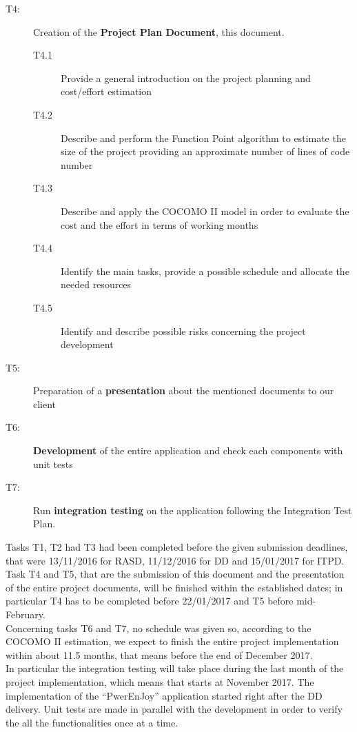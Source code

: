 \begin{description}
	\item[T4:] Creation of the \textbf{Project Plan Document}, this document.
	\begin{description}
		\item[T4.1] Provide a general introduction on the project planning and cost/effort estimation
		\item[T4.2] Describe and perform the Function Point algorithm to estimate the size of the project providing an approximate number of lines of code number
		\item[T4.3] Describe and apply the COCOMO II model in order to evaluate the cost and the effort in terms of working months
		\item[T4.4] Identify the main tasks, provide a possible schedule and allocate the needed resources
		\item[T4.5] Identify and describe possible risks concerning the project development
	\end{description}
	
	\item[T5:] Preparation of a \textbf{presentation} about the mentioned documents to our client
	
	\item[T6:] \textbf{Development} of the entire application and check each components with unit tests
	
	\item[T7:] Run \textbf{integration testing} on the application following the Integration Test Plan.
	
\end{description}
Tasks T1, T2 had T3 had been completed before the given submission deadlines, that were 13/11/2016 for RASD, 11/12/2016 for DD and 15/01/2017 for ITPD. \\
Task T4 and T5, that are the submission of this document and the presentation of the entire project documents, will be finished within the established dates; in particular T4 has to be completed before 22/01/2017 and T5 before mid-February. \\
Concerning tasks T6 and T7, no schedule was given so, according to the COCOMO II estimation, we expect to finish the entire project implementation within about 11.5 months, that means before the end of December 2017. \\ In particular the integration testing will take place during the last month of the project implementation, which means that starts at November 2017.
The implementation of the ``PwerEnJoy'' application started right after the DD delivery. Unit tests are made in parallel with the development in order to verify the all the functionalities once at a time. \\
